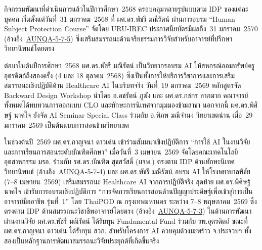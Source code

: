 กิจกรรมพัฒนาที่ดำเนินการแล้วในปีการศึกษา~2568 ครอบคลุมหลายรูปแบบตาม IDP ของแต่ละบุคคล เริ่มตั้งแต่วันที่~31 มกราคม~2568 ที่ ผศ.ดร.พัชรี มณีรัตน์ ผ่านการอบรม ``Human Subject Protection Course'' จัดโดย URU-IREC ประกาศนียบัตรมีผลถึง~31 มกราคม~2570 (อ้างอิง~\hyperlink{ref:AUNQA-5-7-5}{AUNQA-5-7-5}) ซึ่งเสริมสมรรถนะด้านจริยธรรมการวิจัยสำหรับอาจารย์ที่ปรึกษาวิทยานิพนธ์โดยตรง

ต่อมาในต้นปีการศึกษา~2568 ผศ.ดร.พัชรี มณีรัตน์ เป็นวิทยากรอบรม AI ให้สหกรณ์ออมทรัพย์ครูอุตรดิตถ์ถึงสองครั้ง (4 และ 18 ตุลาคม~2568) ซึ่งเป็นทั้งการให้บริการวิชาการและการเสริมสมรรถนะเชิงปฏิบัติด้าน Healthcare AI ในบริบทจริง วันที่~19 มกราคม~2569 หลักสูตรจัด Backward Design Workshop นำโดย อ.คชรัตน์ ภูฆัง และ ผศ.ดร.กชกร ลาภมาก คณาจารย์ทั้งหมดได้ทบทวนการออกแบบ CLO และทักษะการนิเทศจากมุมมองข้ามสาขา นอกจากนี้ ผศ.ดร.พิศิษฐ์ นาคใจ ยังจัด AI Seminar Special Class ร่วมกับ อ.พิภพ มณีจำนง วิทยาเขตน่าน เมื่อ~29 มกราคม~2569 เป็นต้นแบบการสอนข้ามวิทยาเขต

ในช่วงต้นปี~2569 ผศ.ดร.กาญจนา ดาวเด่น เข้าร่วมสัมมนาเชิงปฏิบัติการ ``การใช้ AI ในงานวิจัยและการเรียนการสอนระดับบัณฑิตศึกษา'' เมื่อวันที่~3 เมษายน~2569 จัดโดยคณะเทคโนโลยีอุตสาหกรรม มรอ. ร่วมกับ รศ.ดร.บัณฑิต สุขสวัสดิ์ (มจพ.) ตรงตาม IDP ด้านทักษะนิเทศวิทยานิพนธ์ (อ้างอิง~\hyperlink{ref:AUNQA-5-7-4}{AUNQA-5-7-4}) และ ผศ.ดร.พัชรี มณีรัตน์ อบรม AI ให้โรงพยาบาลพิชัย (7--8 เมษายน~2569) เสริมสมรรถนะ Healthcare AI จากการปฏิบัติจริง สุดท้าย ผศ.ดร.พิศิษฐ์ นาคใจ เข้ารับการอบรมเชิงปฏิบัติการ ``การจัดการเรียนการสอนด้านปัญญาประดิษฐ์เพื่อเข้าสู่การเป็นอาจารย์มืออาชีพ รุ่นที่~1'' โดย ThaiPOD ณ กรุงเทพมหานคร ระหว่าง 7--8 พฤษภาคม~2569 ซึ่งตรงตาม IDP ด้านสมรรถนะวิชาชีพอาจารย์โดยตรง (อ้างอิง~\hyperlink{ref:AUNQA-5-7-3}{AUNQA-5-7-3}) ในด้านการพัฒนาผ่านงานวิจัย ผศ.ดร.พัชรี มณีรัตน์ ได้รับทุน Fundamental Fund ร่วมกับ รพ.อุตรดิตถ์ ขณะที่ ผศ.ดร.กาญจนา ดาวเด่น ได้รับทุน สวก. สำหรับโครงการ AI ควบคุมด้วงมะพร้าว จ.ประจวบฯ ทั้งสองเป็นหลักฐานการพัฒนาสมรรถนะวิจัยประยุกต์ที่เกิดขึ้นจริง

